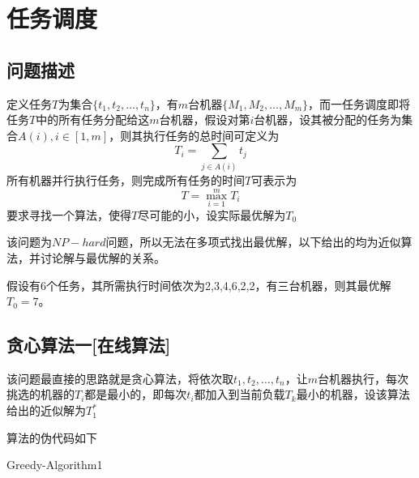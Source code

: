 \section{任务调度}

\subsection{问题描述}
定义任务$T$为集合$\{t_1,t_2,\ldots,t_n\}$，有$m$台机器$\{M_1,M_2,\ldots,M_m\}$，而一任务调度即将任务$T$中的所有任务分配给这$m$台机器，假设对第$i$台机器，设其被分配的任务为集合$A(i),i\in [1,m]$，则其执行任务的总时间可定义为
\begin{equation*}
	T_i=\sum_{j\in A(i)} t_j
\end{equation*}
所有机器并行执行任务，则完成所有任务的时间$T$可表示为
\begin{equation*}
	T=\max_{i=1}^{m} T_i
\end{equation*}
要求寻找一个算法，使得$T$尽可能的小，设实际最优解为$T_0$

该问题为$NP-hard$问题，所以无法在多项式找出最优解，以下给出的均为近似算法，并讨论解与最优解的关系。

\begin{example}
	假设有6个任务，其所需执行时间依次为2,3,4,6,2,2，有三台机器，则其最优解$T_0=7$。
\end{example}

\subsection{贪心算法一[在线算法]}
该问题最直接的思路就是贪心算法，将依次取$t_1,t_2,\ldots,t_n$，让$m$台机器执行，每次挑选的机器的$T_i$都是最小的，即每次$t_i$都加入到当前负载$T_k$最小的机器，设该算法给出的近似解为$T_1^*$

算法的伪代码如下

\begin{algorithm}
	\DontPrintSemicolon{}
	\caption{Greedy-Algorithm1}\label{greedy1-algo}
\end{algorithm}

